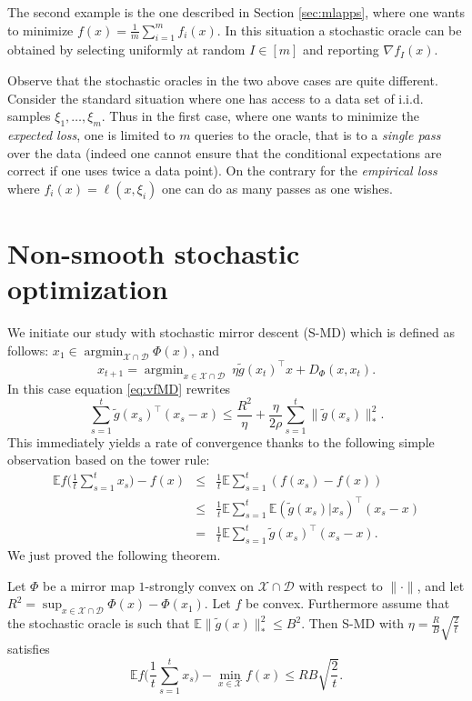 \documentclass[openany]{now}
\newcommand{\tg}{\tilde{g}}
\newcommand{\E}{\mathbb{E}}
\newcommand{\cX}{\mathcal{X}}
\newcommand{\cD}{\mathcal{D}}
\newcommand{\argmin}{\mathop{\mathrm{argmin}}}
\renewcommand{\tilde}{\widetilde}
\begin{document}
The second example is the one described in Section \ref{sec:mlapps}, where one wants to minimize $f(x) = \frac{1}{m} \sum_{i=1}^m f_i(x)$. In this situation a stochastic oracle can be obtained by selecting uniformly at random $I \in [m]$ and reporting $\nabla f_I(x)$.


Observe that the stochastic oracles in the two above cases are quite different. Consider the standard situation where one has access to a data set of i.i.d. samples $\xi_1, \hdots, \xi_m$. Thus in the first case, where one wants to minimize the {\em expected loss}, one is limited to $m$ queries to the oracle, that is to a {\em single pass} over the data (indeed one cannot ensure that the conditional expectations are correct if one uses twice a data point). On the contrary for the {\em empirical loss} where $f_i(x) = \ell(x, \xi_i)$ one can do as many passes as one wishes.

\section{Non-smooth stochastic optimization} \label{sec:smd}
We initiate our study with stochastic mirror descent (S-MD) which is defined as follows: $x_1 \in \argmin_{\cX \cap \cD} \Phi(x)$, and
$$x_{t+1} = \argmin_{x \in \mathcal{X} \cap \mathcal{D}} \ \eta \tilde{g}(x_t)^{\top} x + D_{\Phi}(x,x_t) .$$
In this case equation \eqref{eq:vfMD} rewrites
$$\sum_{s=1}^t \tg(x_s)^{\top} (x_s - x) \leq \frac{R^2}{\eta} + \frac{\eta}{2 \rho} \sum_{s=1}^t \|\tg(x_s)\|_*^2 .$$
This immediately yields a rate of convergence thanks to the following simple observation based on the tower rule:
\begin{eqnarray*}
\E f\bigg(\frac{1}{t} \sum_{s=1}^t x_s \bigg) - f(x) & \leq & \frac{1}{t} \E \sum_{s=1}^t (f(x_s) - f(x)) \\
& \leq & \frac{1}{t} \E \sum_{s=1}^t \E(\tg(x_s) | x_s)^{\top} (x_s - x) \\
& = & \frac{1}{t} \E \sum_{s=1}^t \tg(x_s)^{\top} (x_s - x) .
\end{eqnarray*}
We just proved the following theorem.
\begin{theorem} \label{th:SMD}
Let $\Phi$ be a mirror map $1$-strongly convex on $\mathcal{X} \cap \mathcal{D}$ with respect to $\|\cdot\|$, and
let $R^2 = \sup_{x \in \mathcal{X} \cap \mathcal{D}} \Phi(x) - \Phi(x_1)$. Let $f$ be convex. Furthermore assume that the stochastic oracle is such that $\E \|\tg(x)\|_*^2 \leq B^2$. Then S-MD with $\eta = \frac{R}{B} \sqrt{\frac{2}{t}}$ satisfies
$$\E f\bigg(\frac{1}{t} \sum_{s=1}^t x_s \bigg) - \min_{x \in \mathcal{X}} f(x) \leq R B \sqrt{\frac{2}{t}} .$$
\end{theorem}
\end{document}
